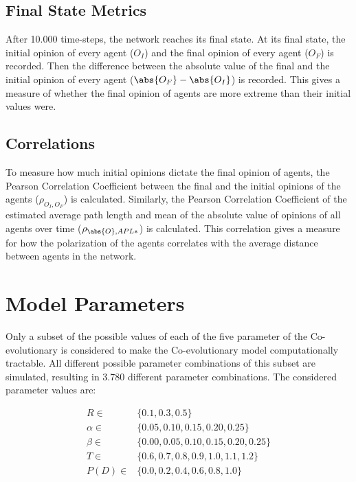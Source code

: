 \documentclass[11pt]{article}
\DeclarePairedDelimiter{\abs}\lvert\rvert
\begin{document}
\subsection{Final State Metrics}
After 10.000 time-steps, the network reaches its final state. 
At its final state, the initial opinion of every agent ($O_I$) and the final opinion of every agent ($O_F$) is recorded. 
Then the difference between the absolute value of the final and the initial opinion of every agent ($\abs{O_F} - \abs{O_I}$) is recorded. This gives a measure of whether the final opinion of agents are more extreme than their initial values were. 

\subsection{Correlations}
To measure how much initial opinions dictate the final opinion of agents, the Pearson Correlation Coefficient between the final and the initial opinions of the agents ($\rho_{O_I, O_F}$) is calculated.
Similarly, the Pearson Correlation Coefficient of the estimated average path length and mean of the absolute value of opinions of all agents over time ($\rho_{\abs{O}, APL*}$) is calculated. This correlation gives a measure for how the polarization of the agents correlates with the average distance between agents in the network.

\section{Model Parameters}

Only a subset of the possible values of each of the five parameter of the Co-evolutionary is considered to make the Co-evolutionary model computationally tractable. All different possible parameter combinations of this subset are simulated, resulting in 3.780 different parameter combinations. The considered parameter values are:

\begin{align*}
    R \in & \{0.1, 0.3, 0.5\} \\
    \alpha \in & \{0.05, 0.10, 0.15, 0.20, 0.25\} \\
    \beta \in & \{0.00, 0.05, 0.10, 0.15, 0.20, 0.25\}\\
    T \in & \{0.6, 0.7, 0.8, 0.9, 1.0, 1.1, 1.2\}\\
    P(D) \in & \{0.0, 0.2, 0.4, 0.6, 0.8, 1.0\}\\
\end{align*}
\end{document}
